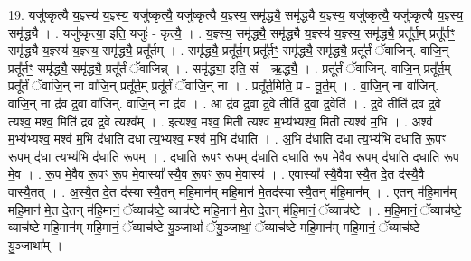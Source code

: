 \documentclass[17pt]{extarticle}
\begin{document}
19. यजु॑ष्कृत्यै य॒ज्ञ्स्य॑ य॒ज्ञ्स्य॒ यजु॑ष्कृत्यै॒ यजु॑ष्कृत्यै य॒ज्ञ्स्य॒ समृ॑द्ध्यै॒ समृ॑द्ध्यै य॒ज्ञ्स्य॒ यजु॑ष्कृत्यै॒ यजु॑ष्कृत्यै य॒ज्ञ्स्य॒ समृ॑द्ध्यै । . यजु॑ष्कृत्या॒ इति॒ यजुः॑ - कृ॒त्यै॒ । . य॒ज्ञ्स्य॒ समृ॑द्ध्यै॒ समृ॑द्ध्यै य॒ज्ञ्स्य॑ य॒ज्ञ्स्य॒ समृ॑द्ध्यै॒ प्रतू᳚र्त॒म् प्रतू᳚र्तꣳ॒॒ समृ॑द्ध्यै य॒ज्ञ्स्य॑ य॒ज्ञ्स्य॒ समृ॑द्ध्यै॒ प्रतू᳚र्तम् । . समृ॑द्ध्यै॒ प्रतू᳚र्त॒म् प्रतू᳚र्तꣳ॒॒ समृ॑द्ध्यै॒ समृ॑द्ध्यै॒ प्रतू᳚र्तं ॅवाजिन्. वाजि॒न् प्रतू᳚र्तꣳ॒॒ समृ॑द्ध्यै॒ समृ॑द्ध्यै॒ प्रतू᳚र्तं ॅवाजिन्न् । . समृ॑द्ध्या॒ इति॒ सं - ऋ॒द्ध्यै॒ । . प्रतू᳚र्तं ॅवाजिन्. वाजि॒न् प्रतू᳚र्त॒म् प्रतू᳚र्तं ॅवाजि॒न् ना वा॑जि॒न् प्रतू᳚र्त॒म् प्रतू᳚र्तं ॅवाजि॒न् ना । . प्रतू᳚र्त॒मिति॒ प्र - तू॒र्त॒म् । . वा॒जि॒न् ना वा॑जिन्. वाजि॒न् ना द्र॑व द्र॒वा वा॑जिन्. वाजि॒न् ना द्र॑व । . आ द्र॑व द्र॒वा द्र॒वे तीति॑ द्र॒वा द्र॒वेति॑ । . द्र॒वे तीति॑ द्रव द्र॒वे त्यश्व॒ मश्व॒ मिति॑ द्रव द्र॒वे त्यश्व᳚म् । . इत्यश्व॒ मश्व॒ मिती त्यश्व॑ म॒भ्य॑भ्यश्व॒ मिती त्यश्व॑ म॒भि । . अश्व॑ म॒भ्य॑भ्यश्व॒ मश्व॑ म॒भि द॑धाति दधा त्य॒भ्यश्व॒ मश्व॑ म॒भि द॑धाति । . अ॒भि द॑धाति दधा त्य॒भ्य॑भि द॑धाति रू॒पꣳ रू॒पम् द॑धा त्य॒भ्य॑भि द॑धाति रू॒पम् । . द॒धा॒ति॒ रू॒पꣳ रू॒पम् द॑धाति दधाति रू॒प मे॒वैव रू॒पम् द॑धाति दधाति रू॒प मे॒व । . रू॒प मे॒वैव रू॒पꣳ रू॒प मे॒वास्या᳚ स्यै॒व रू॒पꣳ रू॒प मे॒वास्य॑ । . ए॒वास्या᳚ स्यै॒वैवा स्यै॒त दे॒त द॑स्यै॒वै वास्यै॒तत् । . अ॒स्यै॒त दे॒त द॑स्या स्यै॒तन् म॑हि॒मान॑म् महि॒मान॑ मे॒तद॑स्या स्यै॒तन् म॑हि॒मान᳚म् । . ए॒तन् म॑हि॒मान॑म् महि॒मान॑ मे॒त दे॒तन् म॑हि॒मानं॒ ॅव्याच॑ष्टे॒ व्याच॑ष्टे महि॒मान॑ मे॒त दे॒तन् म॑हि॒मानं॒ ॅव्याच॑ष्टे । . म॒हि॒मानं॒ ॅव्याच॑ष्टे॒ व्याच॑ष्टे महि॒मान॑म् महि॒मानं॒ ॅव्याच॑ष्टे यु॒ञ्जाथां᳚ ॅयु॒ञ्जाथां॒ ॅव्याच॑ष्टे महि॒मान॑म् महि॒मानं॒ ॅव्याच॑ष्टे यु॒ञ्जाथा᳚म् । \newline
\end{document}
